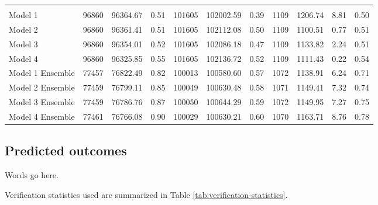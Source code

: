 \documentclass[]{elsarticle} %
\begin{document}
\begin{landscape}
\begin{table}
\begin{tabular}[t]{lrrrrrrrrrr}
\addlinespace[0.3em]
\multicolumn{11}{l}{\textbf{Out-of-sample (backcasting using 2016 dataset)}}\\
\hspace{1em}Model 1 & 96860 & 96364.67 & 0.51 & 101605 & 102002.59 & 0.39 & 1109 & 1206.74 & 8.81 & 0.50\\
\rowcolor{gray!15}
\hspace{1em}Model 2 & 96860 & 96361.41 & 0.51 & 101605 & 102112.08 & 0.50 & 1109 & 1100.51 & 0.77 & 0.51\\
\hspace{1em}Model 3 & 96860 & 96354.01 & 0.52 & 101605 & 102086.18 & 0.47 & 1109 & 1133.82 & 2.24 & 0.51\\
\rowcolor{gray!15}
\hspace{1em}Model 4 & 96860 & 96325.85 & 0.55 & 101605 & 102136.72 & 0.52 & 1109 & 1111.43 & 0.22 & 0.54\\
\hspace{1em}Model 1 Ensemble & 77457 & 76822.49 & 0.82 & 100013 & 100580.60 & 0.57 & 1072 & 1138.91 & 6.24 & 0.71\\
\rowcolor{gray!15}
\hspace{1em}Model 2 Ensemble & 77459 & 76799.11 & 0.85 & 100049 & 100630.48 & 0.58 & 1071 & 1149.41 & 7.32 & 0.74\\
\hspace{1em}Model 3 Ensemble & 77459 & 76786.76 & 0.87 & 100050 & 100644.29 & 0.59 & 1072 & 1149.95 & 7.27 & 0.75\\
\rowcolor{gray!15}
Model 4 Ensemble & 77461 & 76766.08 & 0.90 & 100029 & 100630.21 & 0.60 & 1070 & 1163.71 & 8.76 & 0.78\\
\bottomrule
\end{tabular}
\end{table}
\end{landscape}

\hypertarget{predicted-outcomes}{%
\subsection{Predicted outcomes}\label{predicted-outcomes}}

Words go here.

Verification statistics used are summarized in Table
\ref{tab:verification-statistics}.
\end{document}
